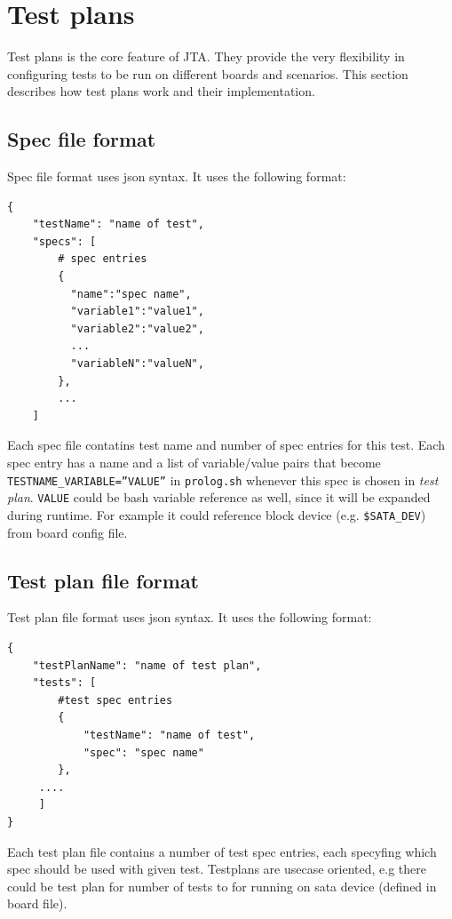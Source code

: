 \section{Test plans}
\label{sec:testplans}

Test plans is the core feature of JTA. They provide the very flexibility in configuring tests to be run on different boards and scenarios.
This section describes how test plans work and their implementation.

\subsection{Spec file format}
\label{sec:spec_fmt}
Spec file format uses json syntax. It uses the following format:
\begin{lstlisting}[label=spec_fmt, caption=Spec file format]
{
    "testName": "name of test",
    "specs": [
        # spec entries
        {
          "name":"spec name",
          "variable1":"value1",
          "variable2":"value2",
          ...
          "variableN":"valueN",
        },
        ...
    ]
  \end{lstlisting}

  Each spec file contatins test name and number of spec entries for this test.
  Each spec entry has a name and a list of variable/value pairs that become \texttt{TESTNAME\_VARIABLE=''VALUE''} in \texttt{prolog.sh} whenever this spec is chosen in \textit{test plan}. \texttt{VALUE} could be bash variable reference as well, since it will be expanded during runtime. For example it could reference block device (e.g. \texttt{\$SATA\_DEV}) from board config file.

\subsection{Test plan file format}
\label{sec:tp_fmt}
Test plan file format uses json syntax. It uses the following format:
\begin{lstlisting}[label=tp_fmt, caption=Test plan file format]
{
    "testPlanName": "name of test plan",
    "tests": [
        #test spec entries
        {
            "testName": "name of test",
            "spec": "spec name"
        },
     ....
     ]  
}
\end{lstlisting}

Each test plan file contains a number of test spec entries, each specyfing which spec should be used with given test. Testplans are usecase oriented, e.g there could be test plan for number of tests to for running on sata device (defined in board file).

